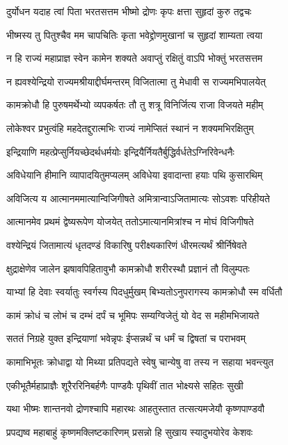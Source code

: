 \twolineshloka
{दुर्योधन यदाह त्वां पिता भरतसत्तम}
{भीष्मो द्रोणः कृपः क्षत्ता सुहृदां कुरु तद्वचः}


\twolineshloka
{भीष्मस्य तु पितुश्चैव मम चापचितिः कृता}
{भवेद्द्रोणमुखानां च सुहृदां शाम्यता त्वया}


\twolineshloka
{न हि राज्यं महाप्राज्ञ स्वेन कामेन शक्यते}
{अवाप्तुं रक्षितुं वाऽपि भोक्तुं भरतसत्तम}


\twolineshloka
{न ह्यवश्येन्द्रियो राज्यमश्रीयाद्दीर्घमन्तरम्}
{विजितात्मा तु मेधावी स राज्यमभिपालयेत्}


\twolineshloka
{कामक्रोधौ हि पुरुषमर्थेभ्यो व्यपकर्षतः}
{तौ तु शत्रू विनिर्जित्य राजा विजयते महीम्}


\twolineshloka
{लोकेश्वर प्रभुत्वंहि महदेतद्दुरात्मभिः}
{राज्यं नामेप्सितं स्थानं न शक्यमभिरक्षितुम्}


\twolineshloka
{इन्द्रियाणि महत्प्रेप्सुर्नियच्छेदर्थधर्मयोः}
{इन्द्रियैर्नियतैर्बुद्धिर्वर्धतेऽग्निरिवेन्धनैः}


\twolineshloka
{अविधेयानि हीमानि व्यापादयितुमप्यलम्}
{अविधेया इवादान्ता हयाः पथि कुसारथिम्}


\twolineshloka
{अविजित्य य आत्मानममात्यान्विजिगीषते}
{अमित्रान्वाऽजितामात्यः सोऽवशः परिहीयते}


\twolineshloka
{आत्मानमेव प्रथमं द्वेष्यरूपेण योजयेत्}
{ततोऽमात्यानमित्रांश्च न मोघं विजिगीषते}


\twolineshloka
{वश्येन्द्रियं जितामात्यं धृतदण्डं विकारिषु}
{परीक्ष्यकारिणं धीरमत्यर्थं श्रीर्निषेवते}


\twolineshloka
{क्षुद्राक्षेणेव जालेन झषावपिहितावुभौ}
{कामक्रोधौ शरीरस्थौ प्रज्ञानं तौ विलुम्पतः}


\twolineshloka
{याभ्यां हि देवाः स्वर्यातुः स्वर्गस्य पिदधुर्मुखम्}
{बिभ्यतोऽनुपरागस्य कामक्रोधौ स्म वर्धितौ}


\twolineshloka
{कामं क्रोधं च लोभं च दम्भं दर्पं च भूमिपः}
{सम्यग्विजेतुं यो वेद स महीमभिजायते}


\twolineshloka
{सततं निग्रहे युक्त इन्द्रियाणां भवेन्नृपः}
{ईप्सन्नर्थं च धर्मं च द्विषतां च पराभवम्}


\twolineshloka
{कामाभिभूतः क्रोधाद्वा यो मिथ्या प्रतिपद्यते}
{स्वेषु चान्येषु वा तस्य न सहाया भवन्त्युत}


\twolineshloka
{एकीभूतैर्महाप्राज्ञैः शूरैररिनिबर्हणैः}
{पाण्डवैः पृथिवीं तात भोक्ष्यसे सहितः सुखी}


\twolineshloka
{यथा भीष्मः शान्तनवो द्रोणश्चापि महारथः}
{आहतुस्तात तत्सत्यमजेयौ कृष्णपाण्डवौ}


\twolineshloka
{प्रपद्यष्व महाबाहुं कृष्णमक्लिष्टकारिणम्}
{प्रसन्नो हि सुखाय स्यादुभयोरेव केशवः}


